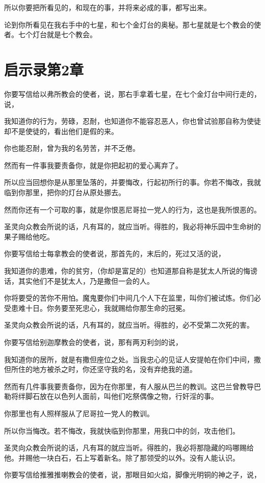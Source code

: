 \documentclass[12pt,oneside]{book}
\begin{document}
所以你要把所看见的，和现在的事，并将来必成的事，都写出来。

论到你所看见在我右手中的七星，和七个金灯台的奥秘。那七星就是七个教会的使者。七个灯台就是七个教会。

\chapter{启示录第2章}
你要写信给以弗所教会的使者，说，那右手拿着七星，在七个金灯台中间行走的，说，

我知道你的行为，劳碌，忍耐，也知道你不能容忍恶人，你也曾试验那自称为使徒却不是使徒的，看出他们是假的来。

你也能忍耐，曾为我的名劳苦，并不乏倦。

然而有一件事我要责备你，就是你把起初的爱心离弃了。

所以应当回想你是从那里坠落的，并要悔改，行起初所行的事。你若不悔改，我就临到你那里，把你的灯台从原处挪去。

然而你还有一个可取的事，就是你恨恶尼哥拉一党人的行为，这也是我所恨恶的。

圣灵向众教会所说的话，凡有耳的，就应当听。得胜的，我必将神乐园中生命树的果子赐给他吃。

你要写信给士每拿教会的使者说，那首先的，末后的，死过又活的说，

我知道你的患难，你的贫穷，（你却是富足的）也知道那自称是犹太人所说的悔谤话，其实他们不是犹太人，乃是撒但一会的人。

你将要受的苦你不用怕。魔鬼要你们中间几个人下在监里，叫你们被试炼。你们必受患难十日。你务要至死忠心，我就赐给你那生命的冠冕。

圣灵向众教会所说的话，凡有耳的，就应当听。得胜的，必不受第二次死的害。

你要写信给别迦摩教会的使者，说，那有两刃利剑的说，

我知道你的居所，就是有撒但座位之处。当我忠心的见证人安提帕在你们中间，撒但所住的地方被杀之时，你还坚守我的名，没有弃绝我的道。

然而有几件事我要责备你，因为在你那里，有人服从巴兰的教训。这巴兰曾教导巴勒将绊脚石放在以色列人面前，叫他们吃祭偶像之物，行奸淫的事。

你那里也有人照样服从了尼哥拉一党人的教训。

所以你当悔改。若不悔改，我就快临到你那里，用我口中的剑，攻击他们。

圣灵向众教会所说的话，凡有耳的就应当听。得胜的，我必将那隐藏的吗哪赐给他。并赐他一块白石，石上写着新名。除了那领受的以外。没有人能认识。

你要写信给推雅推喇教会的使者，说，那眼目如火焰，脚像光明铜的神之子，说，
\end{document}
